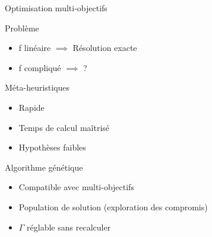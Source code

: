 \begin{frame}{Optimisation multi-objectifs}
        \begin{alertblock}{Problème}
          \begin{itemize}
            \item f linéaire $\implies$ Résolution exacte
            \item f compliqué $\implies$ ?
          \end{itemize}
        \end{alertblock}
        \begin{alertblock}{Méta-heuristiques}
          \begin{itemize}
            \item Rapide
            \item Temps de calcul maîtrisé
            \item Hypothèses faibles
          \end{itemize}
        \end{alertblock}
        \begin{alertblock}{Algorithme génétique}
          \begin{itemize}
            \item Compatible avec multi-objectifs
            \item Population de solution (exploration des compromis)
            \item $\Gamma$ réglable sans recalculer
          \end{itemize}
        \end{alertblock}


\end{frame}


